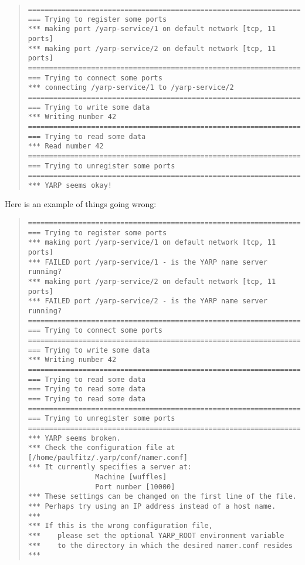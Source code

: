 \begin{quote}
{\small
\begin{verbatim}
=================================================================
=== Trying to register some ports
*** making port /yarp-service/1 on default network [tcp, 11 ports]
*** making port /yarp-service/2 on default network [tcp, 11 ports]
=================================================================
=== Trying to connect some ports
*** connecting /yarp-service/1 to /yarp-service/2
=================================================================
=== Trying to write some data
*** Writing number 42
=================================================================
=== Trying to read some data
*** Read number 42
=================================================================
=== Trying to unregister some ports
=================================================================
*** YARP seems okay!
\end{verbatim}
}
\end{quote}
%
\noindent
Here is an example of things going wrong:
%
\begin{quote}
{\small
\begin{verbatim}
=================================================================
=== Trying to register some ports
*** making port /yarp-service/1 on default network [tcp, 11 ports]
*** FAILED port /yarp-service/1 - is the YARP name server running?
*** making port /yarp-service/2 on default network [tcp, 11 ports]
*** FAILED port /yarp-service/2 - is the YARP name server running?
=================================================================
=== Trying to connect some ports
==================================================================
=== Trying to write some data
*** Writing number 42
=================================================================
=== Trying to read some data
=== Trying to read some data
=== Trying to read some data
=================================================================
=== Trying to unregister some ports
=================================================================
*** YARP seems broken.
*** Check the configuration file at [/home/paulfitz/.yarp/conf/namer.conf]
*** It currently specifies a server at:
                Machine [wuffles]
                Port number [10000]
*** These settings can be changed on the first line of the file.
*** Perhaps try using an IP address instead of a host name.
***
*** If this is the wrong configuration file,
***    please set the optional YARP_ROOT environment variable
***    to the directory in which the desired namer.conf resides
***
\end{verbatim}
}
\end{quote}

